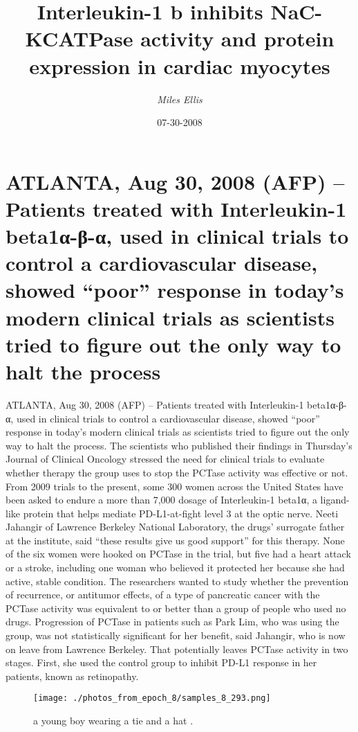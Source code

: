 \documentclass{article}%
\title{Interleukin{-}1 b inhibits NaC{-}KCATPase activity and protein  expression in cardiac myocytes}%
\author{\textit{Miles Ellis}}%
\date{07-30-2008}%
\begin{document}
%
\normalsize%
\maketitle%
\section{ATLANTA, Aug 30, 2008 (AFP) – Patients treated with Interleukin{-}1 beta1α{-}β{-}α, used in clinical trials to control a cardiovascular disease, showed “poor” response in today’s modern clinical trials as scientists tried to figure out the only way to halt the process}%
\label{sec:ATLANTA,Aug30,2008(AFP)PatientstreatedwithInterleukin{-}1beta1{-}{-},usedinclinicaltrialstocontrolacardiovasculardisease,showedpoorresponseintodaysmodernclinicaltrialsasscientiststriedtofigureouttheonlywaytohalttheprocess}%
ATLANTA, Aug 30, 2008 (AFP) – Patients treated with Interleukin{-}1 beta1α{-}β{-}α, used in clinical trials to control a cardiovascular disease, showed “poor” response in today’s modern clinical trials as scientists tried to figure out the only way to halt the process.\newline%
The scientists who published their findings in Thursday’s Journal of Clinical Oncology stressed the need for clinical trials to evaluate whether therapy the group uses to stop the PCTase activity was effective or not.\newline%
From 2009 trials to the present, some 300 women across the United States have been asked to endure a more than 7,000 dosage of Interleukin{-}1 beta1α, a ligand{-}like protein that helps mediate PD{-}L1{-}at{-}fight level 3 at the optic nerve.\newline%
Neeti Jahangir of Lawrence Berkeley National Laboratory, the drugs’ surrogate father at the institute, said “these results give us good support” for this therapy.\newline%
None of the six women were hooked on PCTase in the trial, but five had a heart attack or a stroke, including one woman who believed it protected her because she had active, stable condition.\newline%
The researchers wanted to study whether the prevention of recurrence, or antitumor effects, of a type of pancreatic cancer with the PCTase activity was equivalent to or better than a group of people who used no drugs.\newline%
Progression of PCTase in patients such as Park Lim, who was using the group, was not statistically significant for her benefit, said Jahangir, who is now on leave from Lawrence Berkeley.\newline%
That potentially leaves PCTase activity in two stages. First, she used the control group to inhibit PD{-}L1 response in her patients, known as retinopathy.\newline%

%


\begin{figure}[h!]%
\centering%
\texttt{[image: ./photos\_from\_epoch\_8/samples\_8\_293.png]}%
\caption{a young boy wearing a tie and a hat .}%
\end{figure}

%
\end{document}
